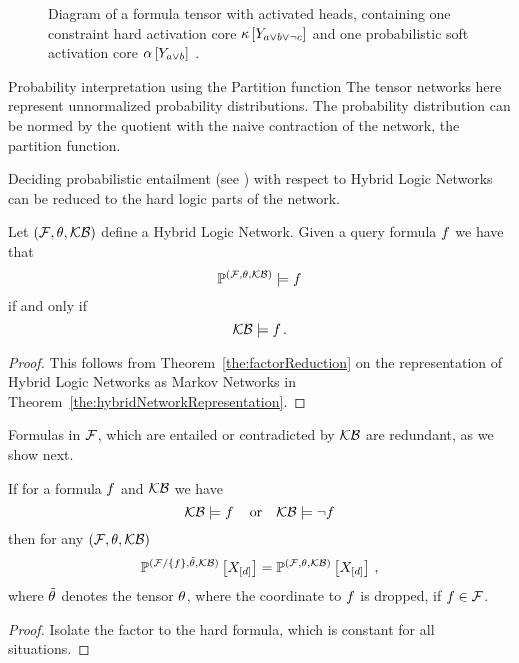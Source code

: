 \begin{figure}[h]
    \begin{center}
        
    \end{center}
    \caption{Diagram of a formula tensor with activated heads, containing one \textcolor{\concolor}{constraint hard activation core $\kappa\left[Y_{a\lor b \lor \lnot c}\right]$} and one \textcolor{\probcolor}{probabilistic soft activation core $\alpha\left[Y_{a\lor b}\right]$} .}
    \label{fig:ActivatedHeads}
\end{figure}



\begin{remark}{Probability interpretation using the Partition function}
    The tensor networks here represent unnormalized probability distributions.
    The probability distribution can be normed by the quotient with the naive contraction of the network, the partition function.
\end{remark}



Deciding probabilistic entailment (see ) with respect to Hybrid Logic Networks can be reduced to the hard logic parts of the network.

\begin{theorem}
    \label{the:hlnEntailmentReduction}
    Let $(\mathcal{F},\theta,\mathcal{KB})$ define a Hybrid Logic Network.
    Given a query formula $f$ we have that
    \[ \mathbb{P}^{(\mathcal{F},\theta,\mathcal{KB})} \models f \]
    if and only if
    \[ \mathcal{KB} \models f \, . \]
\end{theorem}
\begin{proof}
    This follows from Theorem~\ref{the:factorReduction} on the representation of Hybrid Logic Networks as Markov Networks in Theorem~\ref{the:hybridNetworkRepresentation}.
\end{proof}


Formulas in $\mathcal{F}$, which are entailed or contradicted by $\mathcal{KB}$ are redundant, as we show next.

\begin{theorem}%
    If for a formula $f$ and $\mathcal{KB}$ we have
    \[ \mathcal{KB} \models f \, \quad \text{or} \quad \mathcal{KB} \models \lnot f \]
    then for any $(\mathcal{F},\theta,\mathcal{KB})$
    \[ \mathbb{P}^{(\mathcal{F}/\{f\},\tilde{\theta},\mathcal{KB})}\left[X_{[d]}\right] =  \mathbb{P}^{(\mathcal{F},\theta,\mathcal{KB})}\left[X_{[d]}\right]  \, , \]
    where $\tilde{\theta}$ denotes the tensor $\theta$, where the coordinate to $f$ is dropped, if $f\in\mathcal{F}$.
\end{theorem}
\begin{proof}
    Isolate the factor to the hard formula, which is constant for all situations.
\end{proof}


